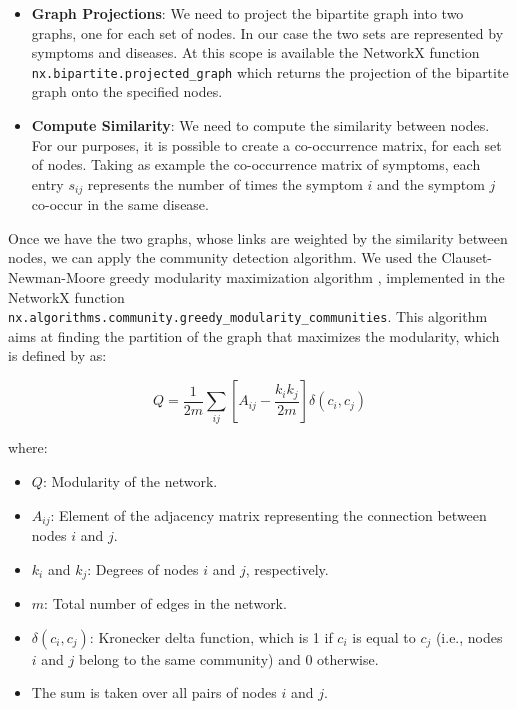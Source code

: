 \begin{itemize}
    \item \textbf{Graph Projections}: We need to project the bipartite graph into two graphs, one for each set of nodes. 
    In our case the two sets are represented by symptoms and diseases. At this scope is available 
    the NetworkX function \texttt{nx.bipartite.projected\_graph} which returns the projection of the bipartite graph onto the specified nodes.
    \item \textbf{Compute Similarity}: We need to compute the similarity between nodes. For our purposes, it is possible to create 
    a co-occurrence matrix, for each set of nodes. 
    Taking as example the co-occurrence matrix of symptoms, each entry $s_{ij}$ represents the number of times the symptom $i$ and 
    the symptom $j$ co-occur in the same disease.
\end{itemize}

\vspace{0.2cm}
\noindent
Once we have the two graphs, whose links are weighted by the similarity between nodes, we can apply the community detection algorithm. We used the 
Clauset-Newman-Moore greedy modularity maximization algorithm \cite{Clauset_Newman_Moore_2004}, implemented in the NetworkX function
\texttt{nx.algorithms.community.greedy\_modularity\_communities}. This algorithm aims at finding the partition of the graph that maximizes the modularity,
which is defined by  \cite{Newman_2006} as:

\begin{equation}
    Q = \frac{1}{2m} \sum_{ij} \left[A_{ij} - \frac{k_i k_j}{2m}\right] \delta(c_i, c_j) \label{eq:modularity}
\end{equation}

\noindent
where:\\

\begin{itemize}
    \item $Q$: Modularity of the network.
    \item $A_{ij}$: Element of the adjacency matrix representing the connection between nodes $i$ and $j$.
    \item $k_i$ and $k_j$: Degrees of nodes $i$ and $j$, respectively.
    \item $m$: Total number of edges in the network.
    \item $\delta(c_i, c_j)$: Kronecker delta function, which is 1 if $c_i$ is equal to $c_j$ (i.e., nodes $i$ and $j$ belong to the same community) and 0 otherwise.
    \item The sum is taken over all pairs of nodes $i$ and $j$.
\end{itemize}





